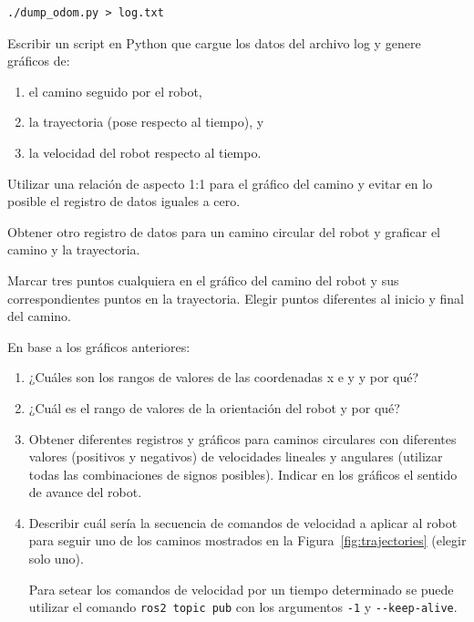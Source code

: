 \documentclass[tp]{lcc}
\begin{document}
\begin{lstlisting}[style=bash] 
./dump_odom.py > log.txt
\end{lstlisting}

\ejercicio Escribir un script en Python que cargue los datos del archivo log y genere gráficos de:
\begin{enumerate}
	\item el camino seguido por el robot,
	\item la trayectoria (pose respecto al tiempo), y
	\item la velocidad del robot respecto al tiempo.
\end{enumerate} 

\begin{nota}
	Utilizar una relación de aspecto 1:1 para el gráfico del camino y evitar en lo posible el registro de datos iguales a cero.
\end{nota}

\ejercicio Obtener otro registro de datos para un camino circular del robot y graficar el camino y la trayectoria.

\ejercicio Marcar tres puntos cualquiera en el gráfico del camino del robot y sus correspondientes puntos en la trayectoria. Elegir puntos diferentes al inicio y final del camino.


En base a los gráficos anteriores:

\begin{enumerate}

\item ¿Cuáles son los rangos de valores de las coordenadas x e y y por qué?

\item  ¿Cuál es el rango de valores de la orientación del robot y por qué?

\item Obtener diferentes registros y gráficos para caminos circulares con diferentes valores (positivos y negativos) de velocidades lineales y angulares (utilizar todas las combinaciones de signos posibles). Indicar en los gráficos el sentido de avance del robot.

\item Describir cuál sería la secuencia de comandos de velocidad a aplicar al robot para seguir uno de los caminos mostrados en la Figura~\ref{fig:trajectories} (elegir solo uno).

\begin{nota}
	Para setear los comandos de velocidad por un tiempo determinado se puede utilizar el comando \lstinline[style=bash]{ros2 topic pub} con los argumentos \lstinline[style=bash]{-1} y \lstinline[style=bash]{--keep-alive}.
\end{nota}

\end{enumerate}
\end{document}
